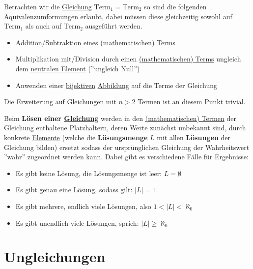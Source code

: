 \documentclass[../../main.tex]{subfiles}
\begin{document}
	\begin{theorem}
		Betrachten wir die \hyperref[def:Gleichung]{Gleichung} $\textrm{Term}_1 = \textrm{Term}_2$ so sind die folgenden Äquivalenzumformungen erlaubt, dabei müssen diese gleichzeitig sowohl auf $\textrm{Term}_1$ als auch auf $\textrm{Term}_2$ ausgeführt werden. 
		
		\begin{itemize}
			\item Addition/Subtraktion eines \hyperref[def:MathematischerTerm]{(mathematischen) Terms}
			\item Multiplikation mit/Division durch einen \hyperref[def:MathematischerTerm]{(mathematischen) Terms} ungleich dem \hyperref[def:neutralesElement]{neutralen Element} (''ungleich Null'')
			\item Anwenden einer \hyperref[def:Bijektiv]{bijektiven} \hyperref[def:Abbildung]{Abbildung} auf die Terme der Gleichung
		\end{itemize}
	
		Die Erweiterung auf Gleichungen mit $n>2$ Termen ist an diesem Punkt trivial.
	\end{theorem}
	
	\begin{definition}
		\label{def:LösenEinerGleichung}
		Beim \textbf{Lösen einer \hyperref[def:Gleichung]{Gleichung}} werden in den \hyperref[def:MathematischerTerm]{(mathematischen) Termen} der Gleichung enthaltene Platzhaltern, deren Werte zunächst unbekannt sind, durch konkrete \hyperref[def:Elemente]{Elemente} (welche die \textbf{Lösungsmenge} $L$ mit allen \textbf{Lösungen} der Gleichung bilden) ersetzt sodass der ursprünglichen Gleichung der Wahrheitswert ''wahr'' zugeordnet werden kann. Dabei gibt es verschiedene Fälle für Ergebnisse: 
		\begin{itemize}
			\item Es gibt keine Lösung, die Lösungsmenge ist leer: $L=\emptyset$
			\item Es gibt genau eine Lösung, sodass gilt: $|L|=1$
			\item Es gibt mehrere, endlich viele Lösungen, also $1 < |L| < \aleph_0$
			\item Es gibt unendlich viele Lösungen, sprich: $|L| \geq \aleph_0$
		\end{itemize}
	\end{definition}
	
	\section{Ungleichungen}
	
	\begin{definition}[Ungleichung]
		\label{def:Ungleichung}
	\end{definition}
	
\end{document}
